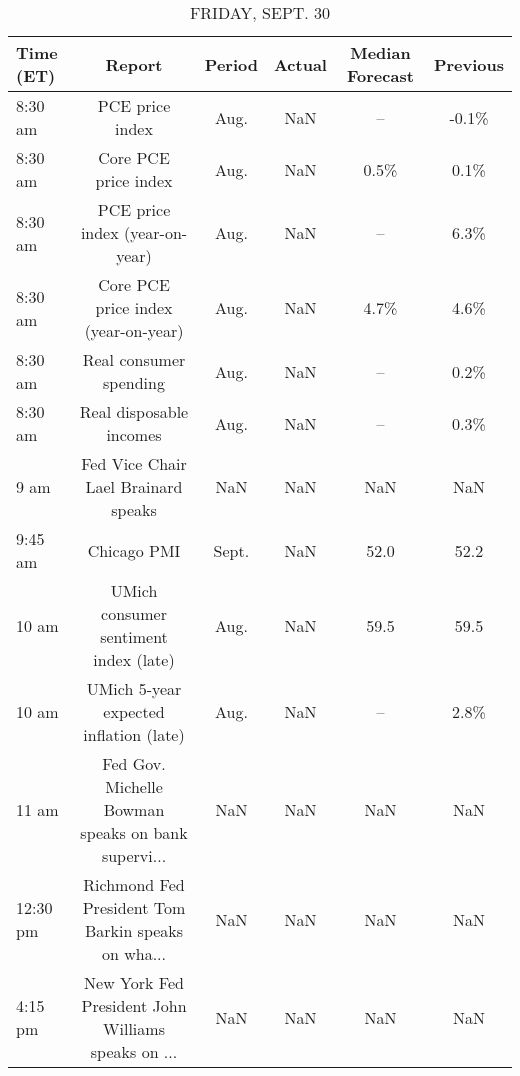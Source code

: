\documentclass{book}
\begin{document}
  
  
  \begin{table}[htbp]%
  \caption{FRIDAY, SEPT. 30}%
  \centering%
  \begin{adjustbox}{width=1\textwidth}%
  \begin{tabular}{lccccc}
  \toprule
  Time (ET) &                                             Report & Period & Actual & Median Forecast & Previous \\
  \midrule
    8:30 am &                                    PCE price index &   Aug. &    NaN &              -- &    -0.1\% \\
    8:30 am &                               Core PCE price index &   Aug. &    NaN &            0.5\% &     0.1\% \\
    8:30 am &                     PCE price index (year-on-year) &   Aug. &    NaN &              -- &     6.3\% \\
    8:30 am &                Core PCE price index (year-on-year) &   Aug. &    NaN &            4.7\% &     4.6\% \\
    8:30 am &                             Real consumer spending &   Aug. &    NaN &              -- &     0.2\% \\
    8:30 am &                            Real disposable incomes &   Aug. &    NaN &              -- &     0.3\% \\
       9 am &                Fed Vice Chair Lael Brainard speaks &    NaN &    NaN &             NaN &      NaN \\
    9:45 am &                                        Chicago PMI &  Sept. &    NaN &            52.0 &     52.2 \\
      10 am &              UMich consumer sentiment index (late) &   Aug. &    NaN &            59.5 &     59.5 \\
      10 am &             UMich 5-year expected inflation (late) &   Aug. &    NaN &              -- &     2.8\% \\
      11 am & Fed Gov. Michelle Bowman speaks on bank supervi... &    NaN &    NaN &             NaN &      NaN \\
   12:30 pm & Richmond Fed President Tom Barkin speaks on wha... &    NaN &    NaN &             NaN &      NaN \\
    4:15 pm & New York Fed President John Williams speaks on ... &    NaN &    NaN &             NaN &      NaN \\
  \bottomrule
  \end{tabular}
  \end{adjustbox}%
  \end{table}
  
\end{document}
